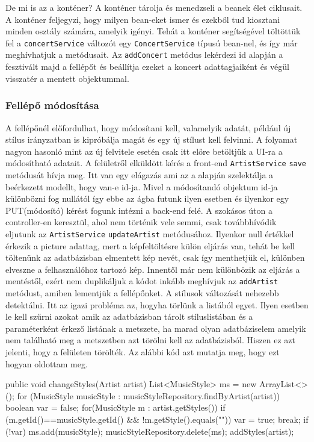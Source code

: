 De mi is az a konténer? A konténer tárolja és menedzseli a beanek élet ciklusait. A konténer feljegyzi, hogy milyen bean-eket ismer és ezekből tud kiosztani minden osztály számára, amelyik igényi. Tehát a konténer segítségével töltöttük fel a \texttt{concertService} változót egy \texttt{ConcertService} típusú bean-nel, és így már meghívhatjuk a metódusait. Az \texttt{addConcert} metódus lekérdezi id alapján a fesztivált majd a fellépőt és beállítja ezeket a koncert adattagjaiként és végül visszatér a mentett objektummal.

\subsubsection{Fellépő módosítása}
A fellépőnél előfordulhat, hogy módosítani kell, valamelyik adatát, például új stílus irányzatban is kipróbálja magát és egy új stílust kell felvinni. A folyamat nagyon hasonló mint az új felvitele esetén csak itt előre betöltjük a UI-ra a módosítható adatait. A felületről elküldött kérés a front-end \texttt{ArtistService} \texttt{save} metódusát hívja meg. Itt van egy elágazás ami az a alapján szelektálja a beérkezett modellt, hogy  van-e id-ja. Mivel a módosítandó objektum id-ja különbözni fog nullától így ebbe az ágba futunk ilyen esetben és ilyenkor egy PUT(módosító) kérést fogunk intézni a back-end felé. A szokásos úton a controller-en keresztül, ahol nem történik vele semmi, csak továbbhívódik eljutunk az \texttt{ArtistService} \texttt{updateArtist} metódusához. Ilyenkor null értékkel érkezik a picture adattag, mert a képfeltöltésre külön eljárás van, tehát be kell töltenünk az adatbázisban elmentett kép nevét, csak így menthetjük el, különben elveszne a felhasználóhoz tartozó kép. Innentől már nem különbözik az eljárás a mentéstől, ezért nem duplikáljuk a kódot inkább meghívjuk az \texttt{addArtist} metódust, amiben lementjük a fellépőnket. A stílusok változását nehezebb detektálni. Itt az igazi probléma az, hogyha törlünk a listából egyet. Ilyen esetben le kell szűrni azokat amik az adatbázisban tárolt stíluslistában és a paraméterként érkező listának a metszete, ha marad olyan adatbáziselem amelyik nem található meg a metszetben azt törölni kell az adatbázisból. Hiszen ez azt jelenti, hogy a felületen törölték. Az alábbi kód azt mutatja meg, hogy ezt hogyan oldottam meg.
\begin{java}
public void changeStyles(Artist artist) {
	List<MusicStyle> ms = new ArrayList<>();
	for (MusicStyle musicStyle :
		musicStyleRepository.findByArtist(artist)) {
		boolean var = false;
		for(MusicStyle m : artist.getStyles()){
			if (m.getId()==musicStyle.getId() && 
				!m.getStyle().equals("")){
				var = true;
				break;
			}
		}
		if (!var){
			ms.add(musicStyle);
		}
	}
	musicStyleRepository.delete(ms);
	addStyles(artist);
}
\end{java}
